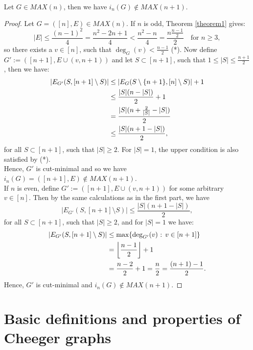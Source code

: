 \begin{prop}
Let \(G\in MAX(n)\), then we have \(i_n(G)\notin MAX(n+1)\).
\begin{proof}
Let \(G=([n],E)\in MAX(n)\). If \(n\) is odd, Theorem \ref{theorem1} gives:
\[
|E|\leq\frac{(n-1)^2}{4}=\frac{n^2-2n+1}{4}<\frac{n^2-n}{4}=\frac{n\frac{n-1}{2}}{2}\quad\text{for }n\geq 3,
\]
so there exists a \(v\in [n]\), such that \(\deg_G(v)<\frac{n-1}{2}\) (*). Now define\\
\(G':=([n+1],E\cup (v,n+1))\) and let \(S\subset [n+1]\), such that \(1\leq |S|\leq\frac{n+1}{2}\), then we have:
\begin{align}
|E_{G'}(S,[n+1]\setminus S)|&\leq |E_G(S\setminus\{n+1\},[n]\setminus S)|+1\notag\\
&\leq\frac{|S|(n-|S|)}{2}+1\notag\\
&=\frac{|S|(n+\frac{2}{|S|}-|S|)}{2}\notag\\
&\leq\frac{|S|(n+1-|S|)}{2},\notag
\end{align}
for all \(S\subset [n+1]\), such that \(|S|\geq 2\). For \(|S|=1\), the upper condition is also satisfied by (*).\\
Hence, \(G'\) is cut-minimal and so we have \(i_n(G)=([n+1],E)\notin MAX(n+1)\).\\
If \(n\) is even, define \(G':=([n+1],E\cup (v,n+1))\) for some arbitrary \(v\in [n]\). Then by the same calculations as in the first part, we have
\[
|E_{G'}(S,[n+1]\setminus S)|\leq\frac{|S|(n+1-|S|)}{2},
\]
for all \(S\subset [n+1]\), such that \(|S|\geq 2\), and for \(|S|=1\) we have:
\begin{align}
|E_{G'}(S,[n+1]\setminus S)|&\leq\text{max}\{\deg_{G'}(v)\text{ : }v\in[n+1]\}\notag\\
&=\left\lfloor\frac{n-1}{2}\right\rfloor +1\notag\\
&=\frac{n-2}{2}+1=\frac{n}{2}=\frac{(n+1)-1}{2}.\notag
\end{align}
Hence, \(G'\) is cut-minimal and \(i_n(G)\notin MAX(n+1)\).
\end{proof}
\end{prop}

\section{Basic definitions and properties of Cheeger graphs}

